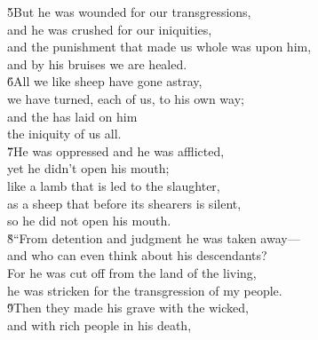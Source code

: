\begin{poetry}
\poeml \v{5}But he was wounded for our transgressions, \\
\poemll    and he was crushed for our iniquities, \\
\poeml and the punishment that made us whole was upon him, \\
\poemll    and by his bruises we are healed. \\
\poeml \v{6}All we like sheep have gone astray, \\
\poemll    we have turned, each of us, to his own way; \\
\poeml and the  has laid on him \\
\poemll    the iniquity of us all. \\
\poeml \v{7}He was oppressed and he was afflicted, \\
\poemll    yet he didn't open his mouth; \\
\poeml like a lamb that is led to the slaughter, \\
\poemll    as a sheep that before its shearers is silent, \\
\poemlll       so he did not open his mouth. \\
\poeml \v{8}``From detention and judgment he was taken away--- \\
\poemll    and who can even think about his descendants? \\
\poeml For he was cut off from the land of the living, \\
\poemll    he was stricken for the transgression of my people. \\
\poeml \v{9}Then they made his grave with the wicked, \\
\poemll    and with rich people in his death, \\

\end{poetry}
